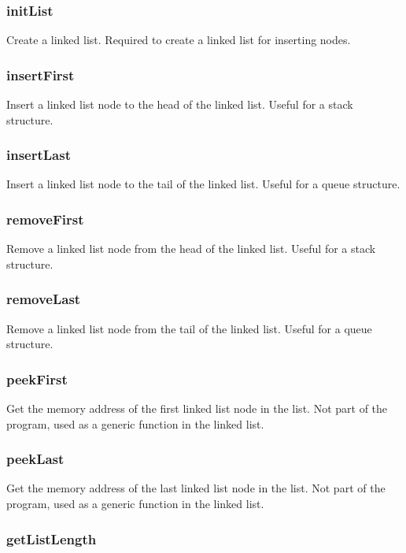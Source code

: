 \documentclass[a4paper, 12pt, titlepage]{article}
\begin{document}
\subsubsection{initList}

Create a linked list. Required to create a linked list for inserting nodes.

\subsubsection{insertFirst}

Insert a linked list node to the head of the linked list. Useful for a 
stack structure.

\subsubsection{insertLast}

Insert a linked list node to the tail of the linked list. Useful for a 
queue structure.

\subsubsection{removeFirst}

Remove a linked list node from the head of the linked list. Useful for a 
stack structure.

\subsubsection{removeLast}

Remove a linked list node from the tail of the linked list. Useful for a 
queue structure.

\subsubsection{peekFirst}

Get the memory address of the first linked list node in the list. Not part of 
the program, used as a generic function in the linked list.

\subsubsection{peekLast}

Get the memory address of the last linked list node in the list. Not part of 
the program, used as a generic function in the linked list.

\subsubsection{getListLength}
\end{document}
